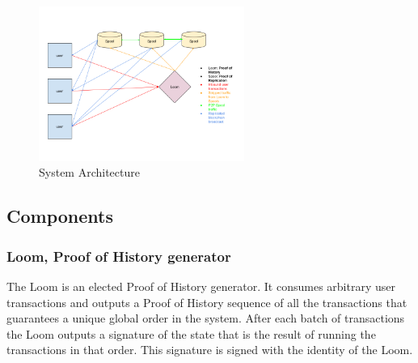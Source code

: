 \documentclass[12pt]{article}
\begin{document}
\begin{figure}
  \begin{center}
    \centering
    \includegraphics[width=0.6\textwidth]{figures/fig_9.png}
    \caption[Fig 9]{System Architecture \label{fig_9}}
  \end{center}
  \end{figure}

\subsection{Components}

\subsubsection{Loom, Proof of History generator}
The Loom is an elected Proof of History generator. It consumes arbitrary user transactions and outputs a Proof of History sequence of all the transactions that guarantees a unique global order in the system. After each batch of transactions the Loom outputs a signature of the state that is the result of running the transactions in that order. This signature is signed with the identity of the Loom.
\end{document}
